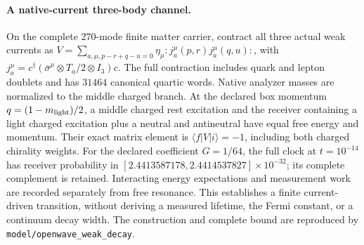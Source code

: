 \paragraph{A native-current three-body channel.}
On the complete $270$-mode finite matter carrier, contract all three actual
weak currents as
$V=\sum_{a,\mu,p-r+q-u=0}\eta_\mu:j_a^\mu(p,r)j_a^\mu(q,u):$,
with $j_a^\mu=c^\dagger(\bar\sigma^\mu\otimes T_a/2\otimes I_3)c$.
The full contraction includes quark and lepton doublets and has $31464$
canonical quartic words. Native analyzer masses are normalized to the
middle charged branch. At the declared box momentum
$q=(1-m_{\rm light})/2$, a middle charged rest excitation and the receiver
containing a light charged excitation plus a neutral and antineutral have
equal free energy and momentum. Their exact matrix element is
$\langle f|V|i\rangle=-1$, including both charged chirality weights.
For the declared coefficient $G=1/64$, the full clock at $t=10^{-14}$ has
receiver probability in
$[2.4413587178,2.4414537827]\times10^{-32}$; its complete complement is
retained. Interacting energy expectations and measurement work are recorded
separately from free resonance. This establishes a finite current-driven
transition, without deriving a measured lifetime, the Fermi constant, or a
continuum decay width. The construction and complete bound are reproduced
by \texttt{model/openwave\_weak\_decay}.
